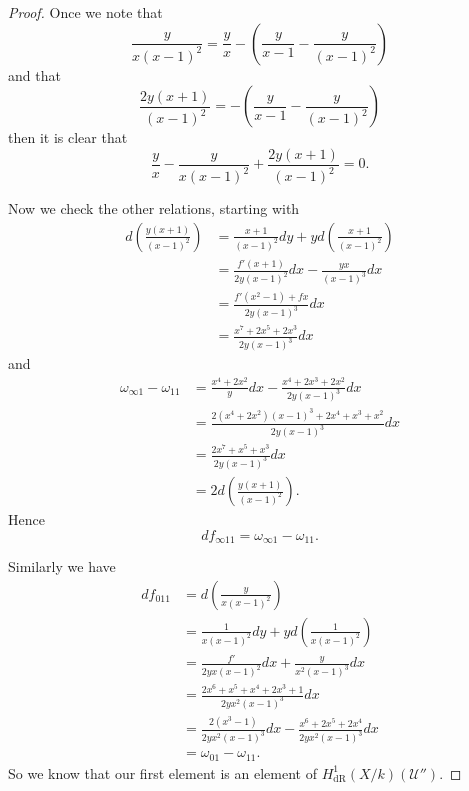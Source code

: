 \documentclass[draft, 11pt]{article} %
\theoremstyle{plain}
\theoremstyle{remark}
\newcommand{\cU}{{\mathcal U}}
\newcommand{\derhamhone}{H_{\text {dR}}^1(X/k)}
\begin{document}
\begin{proof}
Once we note that 
\[
\frac{y}{x(x-1)^2} = \frac{y}{x} -\left(\frac{y}{x-1} - \frac{y}{(x-1)^2} \right)
\]
and that
\[
\frac{2y(x+1)}{(x-1)^2} = -\left( \frac{y}{x-1} - \frac{y}{(x-1)^2}\right)
\]
then it is clear that
\[
\frac{y}{x} - \frac{y}{x(x-1)^2} + \frac{2y(x+1)}{(x-1)^2} = 0.
\]

Now we check the other relations, starting with
\begin{align}
d \left( \frac{y(x+1)}{(x-1)^2} \right) & = \frac{x+1}{(x-1)^2}dy + y d \left( \frac{x+1}{(x-1)^2} \right) \\
& = \frac{f'(x+1)}{2y(x-1)^2}dx - \frac{yx}{(x-1)^3} dx \\
& = \frac{f'(x^2-1) +fx}{2y(x-1)^3}dx \\
& = \frac{x^7 + 2x^5 + 2x^3}{2y(x-1)^3}dx
\end{align}
and
\begin{align}
\omega_{\infty 1} - \omega_{11} & = \frac{x^4 + 2x^2}{y}dx - \frac{x^4 + 2x^3 + 2x^2}{2y(x-1)^3} dx \\
& = \frac{2(x^4 + 2x^2)(x-1)^3 + 2x^4 + x^3 + x^2}{2y(x-1)^3}dx \\
& = \frac{2x^7 + x^5 + x^3}{2y(x-1)^3}dx\\
& = 2d \left( \frac{y(x+1)}{(x-1)^2}\right).
\end{align}
Hence 
\[
df_{\infty 1 1} = \omega_{\infty 1} - \omega_{1 1}.
\]

Similarly we have
\begin{align}
df_{0 1 1} & = d \left( \frac{y}{x(x-1)^2} \right) \\
& = \frac{1}{x(x-1)^2}dy + y d \left( \frac{1}{x(x-1)^2} \right) \\
& = \frac{f'}{2yx(x-1)^2}dx + \frac{y}{x^2(x-1)^3}dx \\
& = \frac{2x^6 + x^5 + x^4 + 2x^3 + 1}{2yx^2(x-1)^3} dx\\
& = \frac{2(x^3-1)}{2yx^2(x-1)^3}dx - \frac{x^6 + 2x^5 + 2x^4}{2yx^2(x-1)^3}dx \\
& = \omega_{01} - \omega_{11}.
\end{align}
So we know that our first element is an element of $\derhamhone (\cU'')$.


\end{proof}
\end{document}

